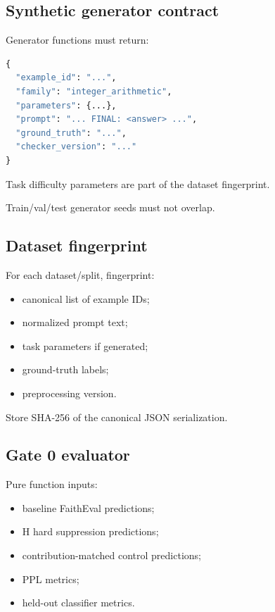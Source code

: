 \subsection{Synthetic generator contract}\label{synthetic-generator-contract}

Generator functions must return:

\begin{lstlisting}[language=Python]
{
  "example_id": "...",
  "family": "integer_arithmetic",
  "parameters": {...},
  "prompt": "... FINAL: <answer> ...",
  "ground_truth": "...",
  "checker_version": "..."
}
\end{lstlisting}

Task difficulty parameters are part of the dataset fingerprint.

Train/val/test generator seeds must not overlap.

\subsection{Dataset fingerprint}\label{dataset-fingerprint}

For each dataset/split, fingerprint:

\begin{itemize}
\tightlist
\item
  canonical list of example IDs;
\item
  normalized prompt text;
\item
  task parameters if generated;
\item
  ground-truth labels;
\item
  preprocessing version.
\end{itemize}

Store SHA-256 of the canonical JSON serialization.

\subsection{Gate 0 evaluator}\label{gate-0-evaluator}

Pure function inputs:

\begin{itemize}
\tightlist
\item
  baseline FaithEval predictions;
\item
  H hard suppression predictions;
\item
  contribution-matched control predictions;
\item
  PPL metrics;
\item
  held-out classifier metrics.
\end{itemize}

